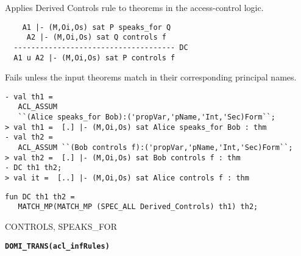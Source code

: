 \SYNOPSIS
Applies Derived Controls rule to theorems in the access-control logic.

\DESCRIBE
\begin{verbatim}
    A1 |- (M,Oi,Os) sat P speaks_for Q   
     A2 |- (M,Oi,Os) sat Q controls f
  ------------------------------------- DC
  A1 u A2 |- (M,Oi,Os) sat P controls f
\end{verbatim}

\FAILURE
Fails unless the input theorems match in their corresponding principal
names.

\EXAMPLE

\begin{holboxed}
\begin{verbatim}
- val th1 = 
   ACL_ASSUM 
   ``(Alice speaks_for Bob):('propVar,'pName,'Int,'Sec)Form``;
> val th1 =  [.] |- (M,Oi,Os) sat Alice speaks_for Bob : thm
- val th2 = 
   ACL_ASSUM ``(Bob controls f):('propVar,'pName,'Int,'Sec)Form``;
> val th2 =  [.] |- (M,Oi,Os) sat Bob controls f : thm
- DC th1 th2;
> val it =  [..] |- (M,Oi,Os) sat Alice controls f : thm
\end{verbatim}
\end{holboxed}

\IMPLEMENTATION
\begin{holboxed}
\begin{verbatim}
fun DC th1 th2 = 
   MATCH_MP(MATCH_MP (SPEC_ALL Derived_Controls) th1) th2;
\end{verbatim}
\end{holboxed}

\SEEALSO
CONTROLS, SPEAKS_FOR
\ENDDOC

\begin{holboxed}
  \begin{Large}
    \textbf{\texttt{DOMI_TRANS}}\hfill{}\textbf{\texttt{(acl\_infRules)}}
  \end{Large}
\end{holboxed}

